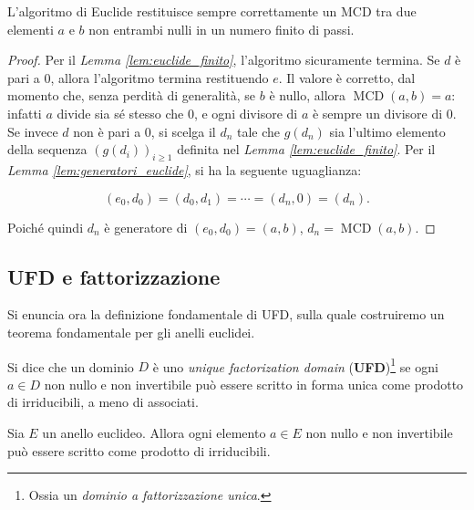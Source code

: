 \documentclass[a4paper]{article}
\DeclareMathOperator{\MCD}{MCD}
\begin{document}
\begin{theorem}
    L'algoritmo di Euclide restituisce sempre correttamente un MCD tra due elementi $a$ e $b$ non entrambi nulli in un numero finito di passi.
\end{theorem}

\begin{proof}
    Per il \textit{Lemma \ref{lem:euclide_finito}}, l'algoritmo sicuramente termina.
    Se $d$ è pari a $0$, allora l'algoritmo termina restituendo $e$. Il valore è
    corretto, dal momento che, senza perdità di generalità, se $b$ è nullo, allora
    $\MCD(a, b)=a$: infatti $a$ divide sia sé stesso che $0$, e ogni divisore di $a$ è
    sempre un divisore di $0$. \\

    Se invece $d$ non è pari a $0$, si scelga il $d_n$ tale che $g(d_n)$ sia l'ultimo
    elemento della sequenza $(g(d_i))_{i\geq1}$ definita nel \textit{Lemma \ref{lem:euclide_finito}}. Per il \textit{Lemma \ref{lem:generatori_euclide}},
    si ha la seguente uguaglianza:

    \[ (e_0, d_0) = (d_0, d_1) = \cdots = (d_n, 0) = (d_n). \]

    \vskip 0.1in

    Poiché quindi $d_n$ è generatore di $(e_0, d_0)=(a,b)$, $d_n = \MCD(a,b)$.
\end{proof}

\subsection{UFD e fattorizzazione}

Si enuncia ora la definizione fondamentale di UFD, sulla
quale costruiremo un teorema fondamentale per gli anelli
euclidei.

\begin{definition}
    Si dice che un dominio $D$ è uno \textit{unique factorization domain} (\textbf{UFD})\footnote{Ossia
        un \textit{dominio a fattorizzazione unica}.} se ogni $a \in D$ non nullo e non invertibile può essere scritto
    in forma unica come prodotto di irriducibili, a meno di associati.
\end{definition}

\begin{lemma}
    \label{lem:fattorizzazione}
    Sia $E$ un anello euclideo. Allora ogni elemento $a \in E$ non nullo e
    non invertibile può essere scritto come prodotto di irriducibili.
\end{lemma}
\end{document}
